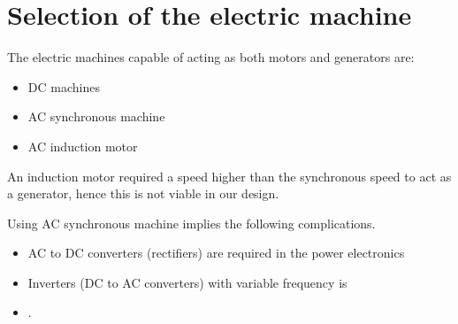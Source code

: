 \documentclass[journal]{IEEEtran}
\begin{document}
\section{Selection of the electric machine}
The electric machines capable of acting as both motors and generators are:
\begin{itemize}
  \item DC machines
  \item AC synchronous machine
  \item AC induction motor
\end{itemize}

An induction motor required a speed higher than the synchronous speed to act as a generator, hence this is not viable in our design.

Using AC synchronous machine implies the following complications.
\begin{itemize}
  \item AC to DC converters (rectifiers) are required in the power electronics
  \item Inverters (DC to AC converters) with variable frequency is 
  \item .
\end{itemize}



\end{document}
